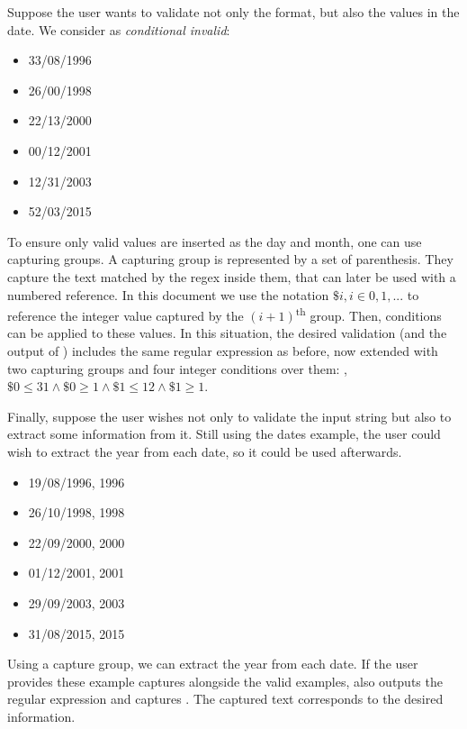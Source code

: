 Suppose the user wants to validate not only the format, but also the values in the date.
We consider as \textit{conditional invalid}:
\begin{multicols}{3}
    \begin{itemize}[label={}]
    \item 33/08/1996
    \item 26/00/1998
    \item 22/13/2000
    \item 00/12/2001
    \item 12/31/2003
    \item 52/03/2015
    \end{itemize}
\end{multicols}
To ensure only valid values are inserted as the day and month, one can use capturing groups. A capturing group is represented by a set of parenthesis. They capture the text matched by the regex inside them, that can later be used with a numbered reference. In this document we use the notation \(\$i, i \in 0, 1, ...\) to reference the integer value captured by the \((i+1)\)\textsuperscript{th} group.
Then, conditions can be applied to these values. In this situation, the desired validation (and the output of \Forest) includes the same regular expression as before, now extended with two capturing groups and four integer conditions over them:
, \(\$0 \le 31 \wedge \$0 \ge 1 \wedge \$1 \le 12 \wedge \$1 \ge 1\).

Finally, suppose the user wishes not only to validate the input string but also to extract some information from it. Still using the dates example, the user could wish to extract the year from each date, so it could be used afterwards.
\begin{multicols}{3}
    \begin{itemize}[label={}]
    \item 19/08/1996, 1996
    \item 26/10/1998, 1998
    \item 22/09/2000, 2000
    \item 01/12/2001, 2001
    \item 29/09/2003, 2003
    \item 31/08/2015, 2015
    \end{itemize}
\end{multicols}

Using a capture group, we can extract the year from each date. If the user provides these example captures alongside the valid examples, \Forest also outputs the regular expression and captures . The captured text corresponds to the desired information.

